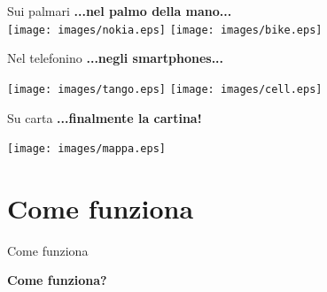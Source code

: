 \documentclass[slidestop,compress,red,notes,xcolor=dvipsnames]{beamer}	%
\begin{document}
    \begin{frame}{Sui palmari}
        \textbf{...nel palmo della mano...}\\
        \vspace{1cm}
        \texttt{[image: images/nokia.eps]}
        \texttt{[image: images/bike.eps]}
    \end{frame}

    \begin{frame}{Nel telefonino}
        \textbf{...negli smartphones...}\\
        \begin{center}
            \texttt{[image: images/tango.eps]}\hspace{1cm}
            \texttt{[image: images/cell.eps]}
        \end{center}
    \end{frame}

    \begin{frame}{Su carta}
        \textbf{...finalmente la cartina!}\\
        \begin{center}
            \texttt{[image: images/mappa.eps]}
        \end{center}
    \end{frame}

    \section{Come funziona}

        \begin{frame}{Come funziona}
        \vspace{1.5cm}
        \begin{huge}\begin{center}\textbf{Come funziona?} \end{center}\end{huge}
        \end{frame}
\end{document}
